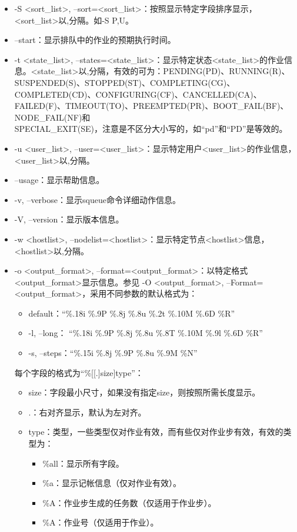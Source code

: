 \begin{itemize}
	\item -S <sort\_list>, --sort=<sort\_list>：按照显示特定字段排序显示，<sort\_list>以,分隔。如-S P,U。
	\item --start：显示排队中的作业的预期执行时间。
	\item -t <state\_list>, --states=<state\_list>：显示特定状态<state\_list>的作业信息。<state\_list>以,分隔，有效的可为：PENDING(PD)、RUNNING(R)、SUSPENDED(S)、STOPPED(ST)、COMPLETING(CG)、COMPLETED(CD)、CONFIGURING(CF)、CANCELLED(CA)、FAILED(F)、TIMEOUT(TO)、PREEMPTED(PR)、BOOT\_FAIL(BF)、NODE\_FAIL(NF)和\\SPECIAL\_EXIT(SE)，注意是不区分大小写的，如``pd''和``PD''是等效的。
	\item -u <user\_list>, --user=<user\_list>：显示特定用户<user\_list>的作业信息，<user\_list>以,分隔。
	\item --usage：显示帮助信息。
	\item -v, --verbose：显示squeue命令详细动作信息。
	\item -V, --version：显示版本信息。
	\item -w <hostlist>, --nodelist=<hostlist>：显示特定节点<hostlist>信息，<hostlist>以,分隔。
	\item -o <output\_format>, --format=<output\_format>：以特定格式<output\_format>显示信息。参见 -O <output\_format>, --Format=<output\_format>，采用不同参数的默认格式为：
	\begin{itemize}
		\item default：``\%.18i \%.9P \%.8j \%.8u \%.2t \%.10M \%.6D \%R''
		\item -l, --long： ``\%.18i \%.9P \%.8j \%.8u \%.8T \%.10M \%.9l \%.6D \%R''
		\item -s, --steps：``\%.15i \%.8j \%.9P \%.8u \%.9M \%N''
	\end{itemize}
	每个字段的格式为``\%[[.]size]type''：
\begin{itemize}
	\item size：字段最小尺寸，如果没有指定size，则按照所需长度显示。
    \item .：右对齐显示，默认为左对齐。
	\item type：类型，一些类型仅对作业有效，而有些仅对作业步有效，有效的类型为：
\begin{itemize}
	\item \%all：显示所有字段。
    \item \%a：显示记帐信息（仅对作业有效）。
    \item \%A：作业步生成的任务数（仅适用于作业步）。
    \item \%A：作业号（仅适用于作业）。

\end{itemize}
\end{itemize}
\end{itemize}

